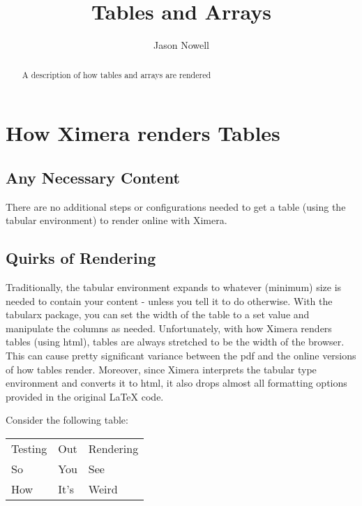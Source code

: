 \documentclass{ximera}
\title{Tables and Arrays}
\author{Jason Nowell}
\begin{document}
\begin{abstract}
    A description of how tables and arrays are rendered
\end{abstract}
\maketitle


\section*{How Ximera renders Tables}
    \subsection*{Any Necessary Content}
        There are no additional steps or configurations needed to get a table (using the tabular environment) to render online with Ximera.
        
        
    \subsection*{Quirks of Rendering}
        Traditionally, the tabular environment expands to whatever (minimum) size is needed to contain your content - unless you tell it to do otherwise. With the tabularx package, you can set the width of the table to a set value and manipulate the columns as needed. Unfortunately, with how Ximera renders tables (using html), tables are always stretched to be the width of the browser. This can cause pretty significant variance between the pdf and the online versions of how tables render. Moreover, since Ximera interprets the tabular type environment and converts it to html, it also drops almost all formatting options provided in the original LaTeX code.
        
        Consider the following table:
        
        \begin{tabular}{lll}
            Testing & Out & Rendering\\
            So      & You & See\\
            How     & It's& Weird\\
        \end{tabular}
        
\end{document}
